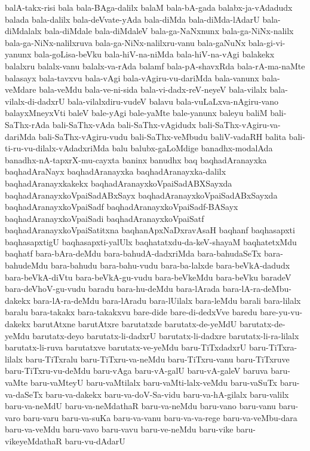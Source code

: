 {balA-takx-risi
bala
bala-BAga-dalilx
balaM
bala-bA-gada
balabx-ja-vAdadudx
balada
bala-dalilx
bala-deVvate-yAda
bala-diMda
bala-diMda-lAdarU
bala-diMdalalx
bala-diMdale
bala-diMdaleV
bala-ga-NaNxnunx
bala-ga-NiNx-nalilx
bala-ga-NiNx-nalilxruva
bala-ga-NiNx-nalilxru-vanu
bala-gaNuNx
bala-gi-vi-yanunx
bala-goLisa-beVku
bala-hiV-na-niMda
bala-hiV-na-vAgi
balakekx
balalxru
balalx-vanu
balalx-va-rAda
balamf
bala-pA-shavxRda
bala-rA-ma-naMte
balasayx
bala-tavxvu
bala-vAgi
bala-vAgiru-vu-dariMda
bala-vanunx
bala-veMdare
bala-veMdu
bala-ve-ni-sida
bala-vi-dadx-reV-neyeV
bala-vilalx
bala-vilalx-di-dadxrU
bala-vilalxdiru-vudeV
balavu
bala-vuLaLxva-nAgiru-vano
balayxMneyxVti
baleV
bale-yAgi
bale-yaMte
bale-yanunx
baleyu
baliM
bali-SaThx-rAda
bali-SaThx-vAda
bali-SaThx-vAgidudx
bali-SaThx-vAgiru-va-dariMda
bali-SaThx-vAgiru-vudu
bali-SaThx-veMbudu
baliV-vadaRH
balita
bali-ti-ru-vu-dilalx-vAdadxriMda
balu
balubx-gaLoMdige
banadhx-modalAda
banadhx-nA-tapxrX-mu-cayxta
baninx
banudhx
baq
baqhadAranayxka
baqhadAraNayx
baqhadAranayxka
baqhadAranayxka-dalilx
baqhadAranayxkakekx
baqhadAranayxkoVpaiSadABXSayxda
baqhadAranayxkoVpaiSadABxSayx
baqhadAranayxkoVpaiSadABxSayxda
baqhadAranayxkoVpaiSadf
baqhadAranayxkoVpaiSadf-BASayx
baqhadAranayxkoVpaiSadi
baqhadAranayxkoVpaiSatf
baqhadAranayxkoVpaiSatitxna
baqhanApxNaDxravAsaH
baqhanf
baqhasapxti
baqhasapxtigU
baqhasapxti-yalUlx
baqhatatxdu-da-keV-shayaM
baqhatetxMdu
baqhatf
bara-bAra-deMdu
bara-bahudA-dadxriMda
bara-bahudaSeTx
bara-bahudeMdu
bara-bahudu
bara-bahu-vudu
bara-ba-lalxde
bara-beVkA-dadudx
bara-beVkA-diVtu
bara-beVkA-gu-vudu
bara-beVkeMdu
bara-beVku
baradeV
bara-deVhoV-gu-vudu
baradu
bara-hu-deMdu
bara-lArada
bara-lA-ra-deMbu-dakekx
bara-lA-ra-deMdu
bara-lAradu
bara-lUilalx
bara-leMdu
barali
bara-lilalx
baralu
bara-takakx
bara-takakxvu
bare-dide
bare-di-dedxVve
baredu
bare-yu-vu-dakekx
barutAtxne
barutAtxre
barutatxde
barutatx-de-yeMdU
barutatx-de-yeMdu
barutatx-deyo
barutatx-li-dadxrU
barutatx-li-dadxre
barutatx-li-ra-lilalx
barutatx-li-ruva
barutatxve
barutatx-ve-yeMdu
baru-TiTxdadxrU
baru-TiTxra-lilalx
baru-TiTxralu
baru-TiTxru-va-neMdu
baru-TiTxru-vanu
baru-TiTxruve
baru-TiTxru-vu-deMdu
baru-vAga
baru-vA-galU
baru-vA-galeV
baruva
baru-vaMte
baru-vaMteyU
baru-vaMtilalx
baru-vaMti-lalx-veMdu
baru-vaSuTx
baru-va-daSeTx
baru-va-dakekx
baru-va-doV-Sa-vidu
baru-va-hA-gilalx
baru-valilx
baru-va-neMdU
baru-va-neMdathaR
baru-va-neMdu
baru-vano
baru-vanu
baru-varo
baru-varu
baru-va-suKa
baru-va-vanu
baru-va-va-rege
baru-va-veMbu-dara
baru-va-veMdu
baru-vavo
baru-vavu
baru-ve-neMdu
baru-vike
baru-vikeyeMdathaR
baru-vu-dAdarU
}
